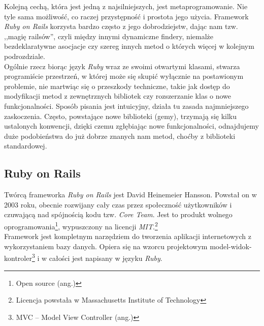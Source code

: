\documentclass[a4paper,12pt]{article}
\begin{document}
Kolejną cechą, która jest jedną z najsilniejszych, jest metaprogramowanie. Nie tyle sama
możliwość, co raczej przystępność i prostota jego użycia. Framework \emph{Ruby on Rails}
korzysta bardzo często z jego dobrodziejstw, dając nam tzw. ,,magię railsów'', czyli
między innymi dynamiczne findery, niemalże bezdeklaratywne asocjacje czy szereg innych
metod o których więcej w kolejnym podrozdziale.\\
Ogólnie rzecz biorąc język \emph{Ruby} wraz ze swoimi otwartymi klasami, stwarza
programiście przestrzeń, w której może się skupić wyłącznie na postawionym problemie, nie
martwiąc się o przeszkody techniczne, takie jak dostęp do modyfikacji metod z zewnętrznych
bibliotek czy rozszerzanie klas o nowe funkcjonalności. Sposób pisania jest intuicyjny,
działa tu zasada najmniejszego zaskoczenia. Często, powstające nowe biblioteki (gemy), trzymają
się kilku ustalonych konwencji, dzięki czemu zgłębiając nowe funkcjonalności, odnajdujemy
duże podobieństwa do już dobrze znanych nam metod, choćby z biblioteki standardowej.


\subsection{Ruby on Rails}
Twórcą frameworka \emph{Ruby on Rails} jest David Heinemeier Hansson. Powstał on w 2003
roku, obecnie rozwijany cały czas przez społeczność użytkowników i czuwającą nad
spójnością kodu tzw. \emph{Core Team}. Jest to produkt wolnego
oprogramowania\footnote{Open source (ang.)}, wypuszczony na licencji
\emph{MIT}.\footnote{Licencja powstała w Massachusetts Institute of Technology}\\
Framework jest kompletnym narzędziem do tworzenia aplikacji internetowych z wykorzystaniem
bazy danych. Opiera się na wzorcu projektowym model-widok-kontroler\footnote{MVC -- Model View
Controller (ang.)} i w całości jest napisany w języku \emph{Ruby}.
\end{document}

